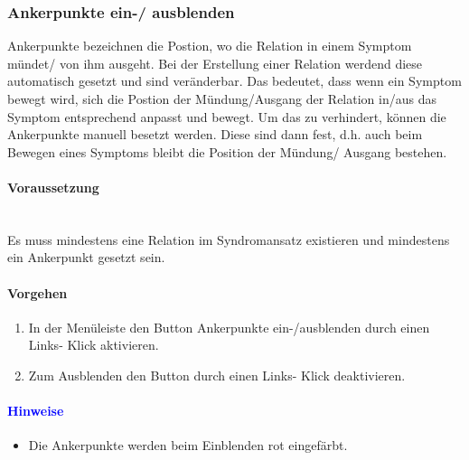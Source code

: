 \documentclass[enabledeprecatedfontcommands,fontsize=11pt,paper=a4,twoside]{scrartcl}
\newcommand*{\hint}{\paragraph{\textcolor{blue}{Hinweise}}}
\newcommand*{\condition}{\paragraph{Voraussetzung}$\;$ \vspace{0.2cm}\\}
\newcommand*{\action}{\paragraph{Vorgehen}}
\begin{document}
		\subsubsection{Ankerpunkte ein-/ ausblenden}
		Ankerpunkte bezeichnen die Postion, wo die Relation in einem Symptom mündet/ von ihm ausgeht. Bei der Erstellung einer Relation werdend diese automatisch gesetzt und sind veränderbar. Das bedeutet, dass wenn ein Symptom bewegt wird, sich die Postion der Mündung/Ausgang der Relation in/aus das Symptom entsprechend anpasst und bewegt. Um das zu verhindert, können die Ankerpunkte manuell besetzt werden. Diese sind dann fest, d.h. auch beim Bewegen eines Symptoms bleibt die Position der Mündung/ Ausgang bestehen.
		\condition
		Es muss mindestens eine Relation im Syndromansatz existieren und mindestens ein Ankerpunkt gesetzt sein. 
		\action
		\begin{enumerate}
			\item In der Menüleiste den Button Ankerpunkte ein-/ausblenden durch einen Links- Klick aktivieren.
			\item Zum Ausblenden den Button durch einen Links- Klick deaktivieren. 
		\end{enumerate}
		\hint
		\begin{itemize}
			\item Die Ankerpunkte werden beim Einblenden rot eingefärbt. 
		\end{itemize}
		\begin{figure}[ht!]
			\centering
		\end{figure}
		
		\newpage
\end{document}
